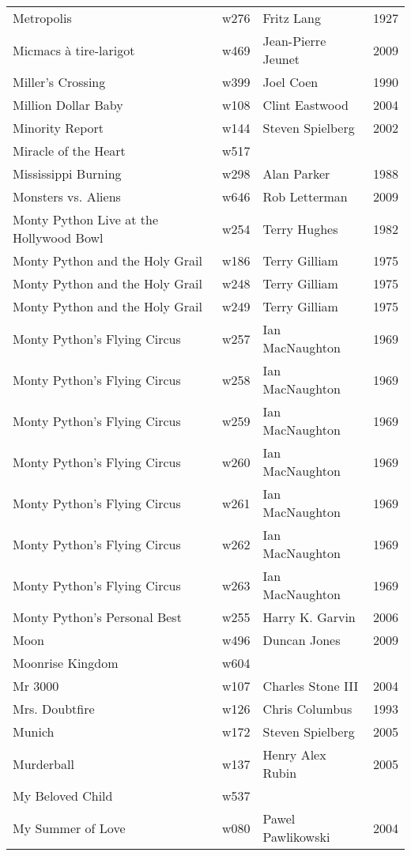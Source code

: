 \documentclass{article}
\begin{document}
\begin {center}
\begin{longtable}{p{10cm} l l l}
Metropolis & w276 & Fritz Lang & 1927 \\
Micmacs à tire-larigot & w469 & Jean-Pierre Jeunet & 2009 \\
Miller's Crossing & w399 & Joel Coen & 1990 \\
Million Dollar Baby & w108 & Clint Eastwood & 2004 \\
Minority Report & w144 & Steven Spielberg & 2002 \\
Miracle of the Heart & w517 &  &  \\
Mississippi Burning & w298 & Alan Parker & 1988 \\
Monsters vs. Aliens & w646 & Rob Letterman & 2009 \\
Monty Python Live at the Hollywood Bowl & w254 & Terry Hughes & 1982 \\
Monty Python and the Holy Grail & w186 & Terry Gilliam & 1975 \\
Monty Python and the Holy Grail & w248 & Terry Gilliam & 1975 \\
Monty Python and the Holy Grail & w249 & Terry Gilliam & 1975 \\
Monty Python's Flying Circus & w257 & Ian MacNaughton & 1969 \\
Monty Python's Flying Circus & w258 & Ian MacNaughton & 1969 \\
Monty Python's Flying Circus & w259 & Ian MacNaughton & 1969 \\
Monty Python's Flying Circus & w260 & Ian MacNaughton & 1969 \\
Monty Python's Flying Circus & w261 & Ian MacNaughton & 1969 \\
Monty Python's Flying Circus & w262 & Ian MacNaughton & 1969 \\
Monty Python's Flying Circus & w263 & Ian MacNaughton & 1969 \\
Monty Python's Personal Best & w255 & Harry K. Garvin & 2006 \\
Moon & w496 & Duncan Jones & 2009 \\
Moonrise Kingdom & w604 &  &  \\
Mr 3000 & w107 & Charles Stone III & 2004 \\
Mrs. Doubtfire & w126 & Chris Columbus & 1993 \\
Munich & w172 & Steven Spielberg & 2005 \\
Murderball & w137 & Henry Alex Rubin & 2005 \\
My Beloved Child & w537 &  &  \\
My Summer of Love & w080 & Pawel Pawlikowski & 2004 \\

\end{longtable}
\end{center}
\end{document}
